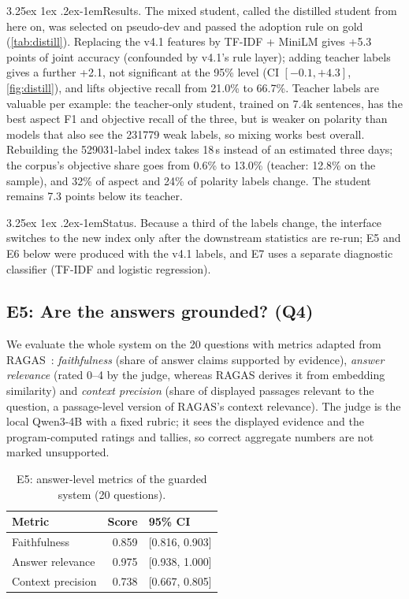 \documentclass[10pt,twocolumn,a4paper]{article}
\makeatletter
\renewcommand\paragraph{\@startsection{paragraph}{4}{\parindent}%
  {3.25ex \@plus 1ex \@minus .2ex}{-1em}{\normalfont\normalsize\bfseries}}
\makeatother
\begin{document}
\paragraph{Results.} The mixed student, called the distilled student from here on, was selected on pseudo-dev and passed the adoption rule on gold
(\cref{tab:distill}). Replacing the v4.1 features by TF-IDF + MiniLM gives +5.3 points of joint accuracy (confounded by
v4.1's rule layer); adding teacher labels gives a further +2.1, not significant at the 95\% level (CI $[-0.1,+4.3]$, \cref{fig:distill}), and lifts
objective recall from 21.0\% to 66.7\%. Teacher labels are valuable per example: the teacher-only student, trained on
7.4k sentences, has the best aspect F1 and objective recall of the three, but is weaker on polarity than models that also
see the \num{231779} weak labels, so mixing works best overall. Rebuilding the \num{529031}-label index takes 18\,s
instead of an estimated three days; the corpus's objective share goes from 0.6\% to 13.0\% (teacher: 12.8\% on the
sample), and 32\% of aspect and 24\% of polarity labels change. The student remains 7.3 points below its teacher.

\paragraph{Status.} Because a third of the labels change, the interface switches to the new index only after the
downstream statistics are re-run; E5 and E6 below were produced with the v4.1 labels, and E7 uses a separate
diagnostic classifier (TF-IDF and logistic regression).

\subsection{E5: Are the answers grounded? (Q4)}
\label{sec:exp-rag}

We evaluate the whole system on the 20 questions with metrics adapted from RAGAS~\cite{ragas}: \emph{faithfulness}
(share of answer claims supported by evidence), \emph{answer relevance} (rated 0--4 by the judge, whereas RAGAS derives
it from embedding similarity) and \emph{context precision} (share of displayed passages relevant to the question, a
passage-level version of RAGAS's context relevance). The judge is the local Qwen3-4B with a fixed rubric; it sees the displayed evidence and the
program-computed ratings and tallies, so correct aggregate numbers are not marked unsupported.

\begin{table}[t]
\centering\small
\caption{E5: answer-level metrics of the guarded system (20 questions).}
\label{tab:rag}
\begin{tabular}{@{}lrl@{}}
\toprule
\textbf{Metric} & \textbf{Score} & \textbf{95\% CI} \\
\midrule
Faithfulness & 0.859 & [0.816, 0.903] \\
Answer relevance & 0.975 & [0.938, 1.000] \\
Context precision & 0.738 & [0.667, 0.805] \\
\bottomrule
\end{tabular}
\end{table}
\end{document}
